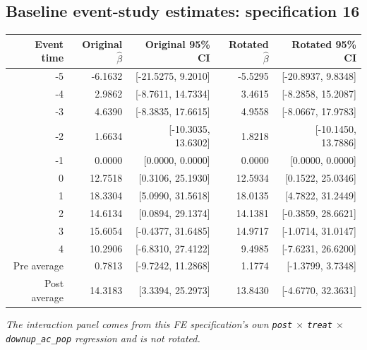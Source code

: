 \documentclass[10pt]{article}
\begin{document}
\subsection*{Baseline event-study estimates: specification 16}
\begin{center}
\scriptsize
\begin{tabular}{r rr rr}
\toprule
Event time & Original $\hat\beta$ & Original 95\% CI & Rotated $\hat\beta$ & Rotated 95\% CI \\
\midrule
-5 & -6.1632 & [-21.5275, 9.2010] & -5.5295 & [-20.8937, 9.8348] \\
-4 & 2.9862 & [-8.7611, 14.7334] & 3.4615 & [-8.2858, 15.2087] \\
-3 & 4.6390 & [-8.3835, 17.6615] & 4.9558 & [-8.0667, 17.9783] \\
-2 & 1.6634 & [-10.3035, 13.6302] & 1.8218 & [-10.1450, 13.7886] \\
-1 & 0.0000 & [0.0000, 0.0000] & 0.0000 & [0.0000, 0.0000] \\
0 & 12.7518 & [0.3106, 25.1930] & 12.5934 & [0.1522, 25.0346] \\
1 & 18.3304 & [5.0990, 31.5618] & 18.0135 & [4.7822, 31.2449] \\
2 & 14.6134 & [0.0894, 29.1374] & 14.1381 & [-0.3859, 28.6621] \\
3 & 15.6054 & [-0.4377, 31.6485] & 14.9717 & [-1.0714, 31.0147] \\
4 & 10.2906 & [-6.8310, 27.4122] & 9.4985 & [-7.6231, 26.6200] \\
\midrule
Pre average & 0.7813 & [-9.7242, 11.2868] & 1.1774 & [-1.3799, 3.7348] \\
Post average & 14.3183 & [3.3394, 25.2973] & 13.8430 & [-4.6770, 32.3631] \\
\bottomrule
\end{tabular}
\end{center}
\medskip
\textit{The interaction panel comes from this FE specification's own \texttt{post} $\times$ \texttt{treat} $\times$ \texttt{downup\_ac\_pop} regression and is not rotated.}
\clearpage
\end{document}
